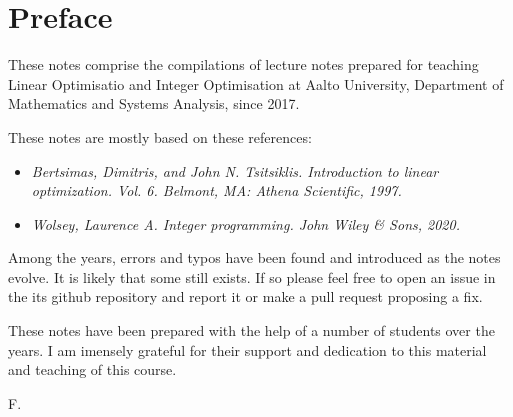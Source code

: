 \section*{Preface}

These notes comprise the compilations of lecture notes prepared for teaching Linear Optimisatio and Integer Optimisation at Aalto University, Department of Mathematics and Systems Analysis, since 2017.

These notes are mostly based on these references:

\begin{itemize}
    \item \textit{Bertsimas, Dimitris, and John N. Tsitsiklis. Introduction to linear optimization. Vol. 6. Belmont, MA: Athena Scientific, 1997.}
    \item \textit{Wolsey, Laurence A. Integer programming. John Wiley & Sons, 2020.}
\end{itemize}

Among the years, errors and typos have been found and introduced as the notes evolve. It is likely that some still exists. If so please feel free to open an issue in the its github repository and report it or make a pull request proposing a fix.

These notes have been prepared with the help of a number of students over the years. I am imensely grateful for their support and dedication to this material and teaching of this course.

F.
